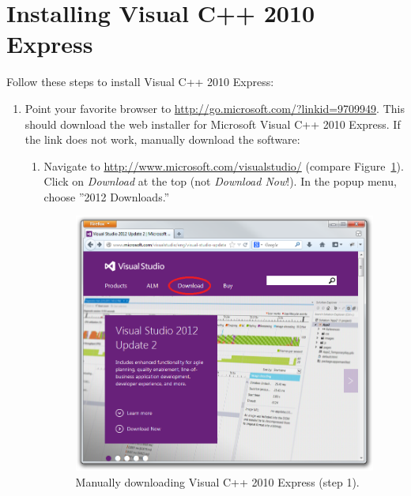%
% 
%
%
%

\section{Installing Visual C++ 2010 Express}
\label{appx:install_vs}

Follow these steps to install Visual C++ 2010 Express:

\begin{enumerate}
	\item Point your favorite browser to
		\url{http://go.microsoft.com/?linkid=9709949}.
		This should download the web installer for Microsoft Visual C++ 2010 Express.
		If the link does not work, manually download the software:
		
		\begin{enumerate}
			\item Navigate to \url{http://www.microsoft.com/visualstudio/}
				(compare Figure~\ref{fig:setup_vs_download1}).
				Click on \emph{Download} at the top (not \emph{Download Now}!).
				In the popup menu, choose ''2012 Downloads.''

\begin{figure}[htbp]
	\centering
	\includegraphics[scale=0.4]{figures/setup_vs_download1_edited.png}
	\caption{Manually downloading Visual C++ 2010 Express (step 1).}
	\label{fig:setup_vs_download1}
\end{figure}


\end{enumerate}
\end{enumerate}
